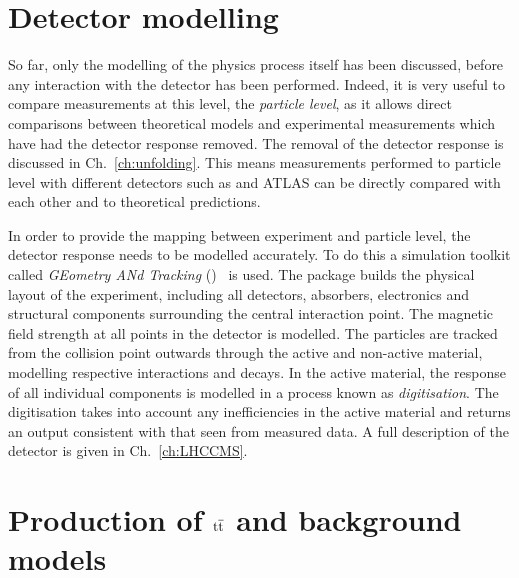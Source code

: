 \section{Detector modelling} %
\label{sec:detector_modelling}

So far, only the modelling of the physics process itself has been discussed, before any interaction with the detector has been performed.
Indeed, it is very useful to compare measurements at this level, the \textit{particle level}, as it allows direct comparisons between theoretical models and experimental measurements which have had the detector response removed.
The removal of the detector response is discussed in Ch.~\ref{ch:unfolding}.
This means measurements performed to particle level with different detectors such as \CMS{} and ATLAS can be directly compared with each other and to theoretical predictions.

In order to provide the mapping between experiment and particle level, the detector response needs to be modelled accurately.
To do this a simulation toolkit called \textit{GEometry ANd Tracking} (\GEANT{})~\cite{Gen:GEANT} is used.
The \GEANT{} package builds the physical layout of the experiment, including all detectors, absorbers, electronics and structural components surrounding the central interaction point.
The magnetic field strength at all points in the detector is modelled.
The particles are tracked from the collision point outwards through the active and non-active material, modelling respective interactions and decays.
In the active material, the response of all individual components is modelled in a process known as \textit{digitisation}.
The digitisation takes into account any inefficiencies in the active material and returns an output consistent with that seen from measured data.
A full description of the \CMS{} detector is given in Ch.~\ref{ch:LHCCMS}.


\section{Production of $\mathbf{\mathrm{t}\overline{\mathrm{t}}}$ and background models}
\label{sec:ttMC}

